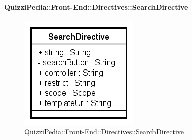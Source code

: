 \paragraph{QuizziPedia::Front-End::Directives::SearchDirective}

\label{QuizziPedia::Front-End::Directives::SearchDirective}

\begin{figure}[h]
	\centering
	\includegraphics[scale=0.5,keepaspectratio]{UML/Classi/Front-End/QuizziPedia_Front-end_Directives_SearchDirective.png}
	\caption{QuizziPedia::Front-End::Directives::SearchDirective}
\end{figure}

